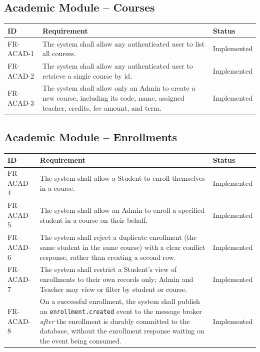 \documentclass[11pt,a4paper]{report}
\begin{document}
\subsection{Academic Module -- Courses}
\begin{longtable}{p{1.9cm} L{10.3cm} p{2.1cm}}
\toprule
\textbf{ID} & \textbf{Requirement} & \textbf{Status} \\
\midrule
\endhead
FR-ACAD-1 & The system shall allow any authenticated user to list all courses. & Implemented \\
FR-ACAD-2 & The system shall allow any authenticated user to retrieve a single course by id. & Implemented \\
FR-ACAD-3 & The system shall allow only an Admin to create a new course, including its code, name, assigned teacher, credits, fee amount, and term. & Implemented \\
\bottomrule
\end{longtable}

\subsection{Academic Module -- Enrollments}
\begin{longtable}{p{1.9cm} L{10.3cm} p{2.1cm}}
\toprule
\textbf{ID} & \textbf{Requirement} & \textbf{Status} \\
\midrule
\endhead
FR-ACAD-4 & The system shall allow a Student to enroll themselves in a course. & Implemented \\
FR-ACAD-5 & The system shall allow an Admin to enroll a specified student in a course on their behalf. & Implemented \\
FR-ACAD-6 & The system shall reject a duplicate enrollment (the same student in the same course) with a clear conflict response, rather than creating a second row. & Implemented \\
FR-ACAD-7 & The system shall restrict a Student's view of enrollments to their own records only; Admin and Teacher may view or filter by student or course. & Implemented \\
FR-ACAD-8 & On a successful enrollment, the system shall publish an \texttt{enrollment.created} event to the message broker \emph{after} the enrollment is durably committed to the database, without the enrollment response waiting on the event being consumed. & Implemented \\
\bottomrule
\end{longtable}
\end{document}
